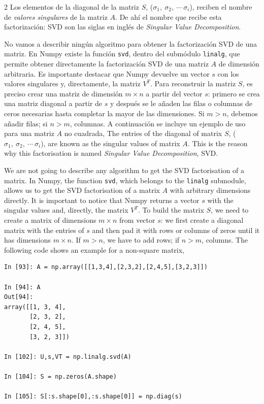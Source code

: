 \begin{paracol}{2}
Los elementos de la diagonal de la matriz $S$, ($\sigma_1, \ \sigma_2, \  \cdots \ \sigma_i$), reciben el nombre de \emph{valores singulares} de la matriz $A$. De ahí el nombre que recibe esta factorización: SVD son las siglas en inglés de \emph{Singular Value Decomposition}.

No vamos a describir ningún algoritmo para obtener la factorización SVD de una matriz. En Numpy existe la función \texttt{svd}, dentro del submódulo \texttt{linalg}, que permite obtener directamente la factorización SVD de una matriz $A$ de dimensión arbitraria. Es importante destacar que Numpy devuelve un vector $s$ con los valores singulares y, directamente, la matriz $V^T$. Para reconstruir la matriz $S$, es preciso crear una matriz de dimensión $m\times n$ a partir del vector $s$: primero se crea una matriz diagonal a partir de $s$ y después se le añaden las filas o columnas de ceros necesarias hasta completar la mayor de las dimensiones. Si $m>n$, debemos añadir filas; si $n>m$, columnas. A continuación se incluye un ejemplo de uso para una matriz $A$ no cuadrada,
\switchcolumn
The entries of the diagonal of matrix $S$, ($\sigma_1, \ \sigma_2, \  \cdots \ \sigma_i$), are known as the singular values of matrix $A$. This is the reason why this factorisation is named \emph{Singular Value Decomposition}, SVD.

We are not going to describe any algorithm to get the SVD factorisation of a matrix. In Numpy, the function \texttt{svd}, which belongs to the \texttt{linalg} submodule, allows us to get the SVD factorisation of a matrix $A$ with arbitrary dimensions directly. It is important to notice that Numpy returns a vector $s$ with the singular values and, directly, the matrix $V^T$. To build the matrix $S$, we need to create a matrix of dimensions $m\times n$ from vector $s$: we first create a diagonal matrix with the entries of $s$ and then pad it with rows or columns of zeros until it has dimensions $m\times n$. If $m>n$, we have to add rows; if $n>m$, columns. The following code shows an example for a non-square matrix,  
\end{paracol}
\begin{center}
    \begin{minipage}{0.7\textwidth}
    \begin{verbatim}
In [93]: A = np.array([[1,3,4],[2,3,2],[2,4,5],[3,2,3]])

In [94]: A
Out[94]: 
array([[1, 3, 4],
       [2, 3, 2],
       [2, 4, 5],
       [3, 2, 3]])

In [102]: U,s,VT = np.linalg.svd(A)

In [104]: S = np.zeros(A.shape)

In [105]: S[:s.shape[0],:s.shape[0]] = np.diag(s)
\end{verbatim}
\end{minipage}
\end{center}

